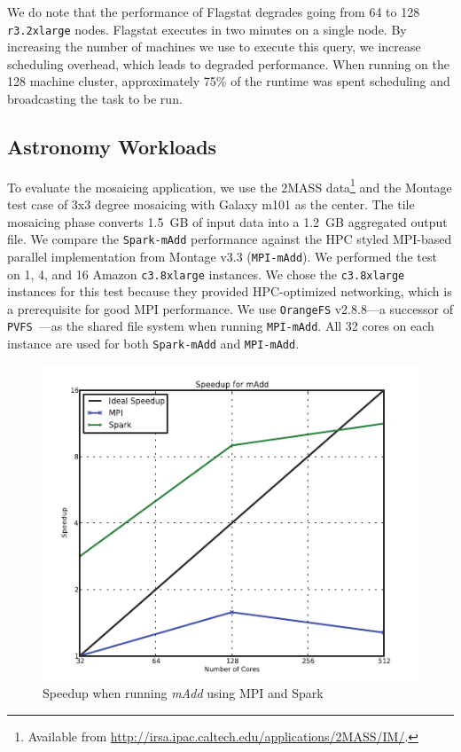 \documentclass{sig-alternate}
\begin{document}
We do note that the performance of Flagstat degrades going from 64 to 128 \texttt{r3.2xlarge} nodes.
Flagstat executes in two minutes on a single node. By increasing the number of machines
we use to execute this query, we increase scheduling overhead, which leads to degraded
performance. When running on the 128 machine cluster, approximately 75\% of the runtime was spent
scheduling and broadcasting the task to be run.

\subsection{Astronomy Workloads}
\label{sec:astro-workloads}

To evaluate the mosaicing application, we use the 2MASS data\footnote{Available from
\url{http://irsa.ipac.caltech.edu/applications/2MASS/IM/}.} and the Montage test case of 3x3 degree
mosaicing with Galaxy m101 as the center. The tile mosaicing phase converts 1.5~GB of input data into a
1.2~GB aggregated output file. We compare the \texttt{Spark-mAdd} performance against the HPC styled
MPI-based parallel implementation from Montage v3.3 (\texttt{MPI-mAdd}). We
performed the test on 1, 4, and 16 Amazon \texttt{c3.8xlarge} instances. We chose the \texttt{c3.8xlarge} instances
for this test because they provided HPC-optimized networking, which is a prerequisite for good MPI performance.
We use \texttt{OrangeFS} v2.8.8---a successor of \texttt{PVFS}~\cite{PVFS}---as the shared file system when running
\texttt{MPI-mAdd}. All 32 cores on each instance are used for both \texttt{Spark-mAdd} and \texttt{MPI-mAdd}.

\begin{figure}[h]
\begin{center}
\includegraphics{graphs/speedup_madd.pdf}
\end{center}
\caption{Speedup when running \textit{mAdd} using MPI and Spark}
\label{fig:madd-speedup}
\end{figure}
\end{document}
